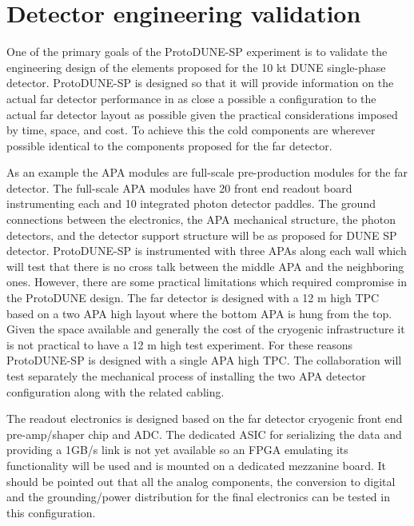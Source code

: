 \section{Detector engineering validation}  %

One of the primary goals of the ProtoDUNE-SP experiment is to validate the engineering design of the elements proposed for the 10 kt DUNE single-phase detector. ProtoDUNE-SP is designed so that it will provide information on the actual far detector performance in as close a possible a configuration to the actual far detector layout as possible given the practical considerations imposed by time, space, and cost. To achieve this the cold components are wherever possible identical to the components proposed for the far detector. 

As an example the APA modules are full-scale pre-production modules for the far detector. The full-scale APA modules have 20 front end readout board instrumenting each and 10 integrated photon detector paddles. The ground connections between the electronics, the APA mechanical structure, the photon detectors, and the detector support structure will be as proposed for DUNE SP detector. ProtoDUNE-SP is instrumented with three APAs along each wall which will test that there is no cross talk between the middle APA and the neighboring ones. However, there are some practical limitations which required compromise in the ProtoDUNE design. The far detector is designed with a 12 m high TPC based on a two APA high layout where the bottom APA is hung from the top. Given the space available and generally the cost of the cryogenic infrastructure it is not practical to have a 12 m high test experiment. For these reasons ProtoDUNE-SP is designed with a single APA high TPC. The collaboration will test separately the mechanical process of installing the two APA detector configuration along with the related cabling.

The readout electronics is designed based on the far detector cryogenic front end pre-amp/shaper chip and ADC.  The dedicated ASIC for serializing the data and providing a 1GB/s link is not yet available so an FPGA emulating its functionality will be used and is mounted on a dedicated mezzanine board. It should be pointed out that all the analog components, the conversion to digital and the grounding/power distribution for the final electronics can be tested in this configuration. 

